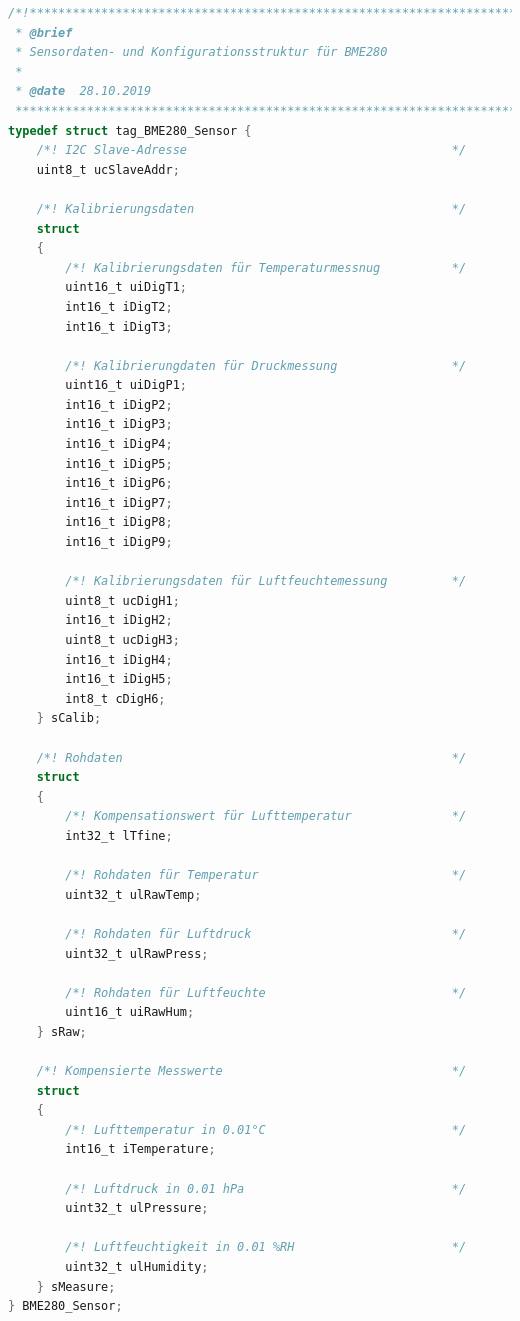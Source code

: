             \begin{lstlisting}[language=C,caption={Typdefinition für die Sensordaten-Speicherstruktur des BME280},label=lst:bme280_typedef]
/*!****************************************************************************
 * @brief
 * Sensordaten- und Konfigurationsstruktur für BME280
 *
 * @date  28.10.2019
 ******************************************************************************/
typedef struct tag_BME280_Sensor {
    /*! I2C Slave-Adresse                                     */
    uint8_t ucSlaveAddr;
    
    /*! Kalibrierungsdaten                                    */
    struct
    {
        /*! Kalibrierungsdaten für Temperaturmessnug          */
        uint16_t uiDigT1;
        int16_t iDigT2;
        int16_t iDigT3;
        
        /*! Kalibrierungdaten für Druckmessung                */
        uint16_t uiDigP1;
        int16_t iDigP2;
        int16_t iDigP3;
        int16_t iDigP4;
        int16_t iDigP5;
        int16_t iDigP6;
        int16_t iDigP7;
        int16_t iDigP8;
        int16_t iDigP9;
        
        /*! Kalibrierungsdaten für Luftfeuchtemessung         */
        uint8_t ucDigH1;
        int16_t iDigH2;
        uint8_t ucDigH3;
        int16_t iDigH4;
        int16_t iDigH5;
        int8_t cDigH6;
    } sCalib;
    
    /*! Rohdaten                                              */
    struct
    {
        /*! Kompensationswert für Lufttemperatur              */
        int32_t lTfine;
        
        /*! Rohdaten für Temperatur                           */
        uint32_t ulRawTemp;
        
        /*! Rohdaten für Luftdruck                            */
        uint32_t ulRawPress;
        
        /*! Rohdaten für Luftfeuchte                          */
        uint16_t uiRawHum;
    } sRaw;
    
    /*! Kompensierte Messwerte                                */
    struct
    {    
        /*! Lufttemperatur in 0.01°C                          */
        int16_t iTemperature;
        
        /*! Luftdruck in 0.01 hPa                             */
        uint32_t ulPressure;
        
        /*! Luftfeuchtigkeit in 0.01 %RH                      */
        uint32_t ulHumidity;
    } sMeasure;
} BME280_Sensor;
            \end{lstlisting}
    
